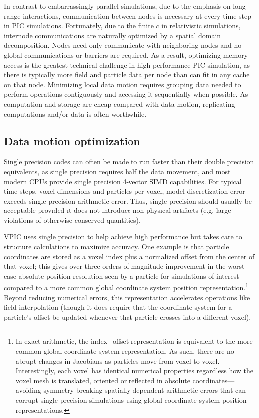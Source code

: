 \documentclass[journal,twoside]{IEEEtran}
\begin{document}
In contrast to embarrassingly parallel simulations, due to the
emphasis on long range interactions, communication between nodes is
necessary at every time step in PIC simulations.  Fortunately, due to the
finite $c$ in relativistic simulations, internode communications are
naturally optimized by a spatial domain decomposition.  Nodes need
only communicate with neighboring nodes and no global communications
or barriers are required.  As a result, optimizing memory access is
the greatest technical challenge in high performance PIC simulation, as
there is typically more field and particle data per node than can fit
in any cache on that node.  Minimizing local data motion requires
grouping data needed to perform operations contiguously and accessing
it sequentially when possible.  As computation and storage are cheap
compared with data motion, replicating computations and/or data is
often worthwhile.

\subsection{Data motion optimization}

Single precision codes can often be made to run faster than their
double precision equivalents, as single precision requires half the
data movement, and most modern CPUs provide single precision 4-vector
SIMD capabilities.  For typical time steps, voxel dimensions and
particles per voxel, model discretization error exceeds single
precision arithmetic error.  Thus, single precision should usually be
acceptable provided it does not introduce non-physical artifacts
(e.g. large violations of otherwise conserved quantities).

VPIC uses single precision to help achieve high performance but takes
care to structure calculations to maximize accuracy.  One example is
that particle coordinates are stored as a voxel index plus a
normalized offset from the center of that voxel; this gives over three
orders of magnitude improvement in the worst case absolute position
resolution seen by a particle for simulations of interest compared to
a more common global coordinate system position
representation.\footnote{In exact arithmetic, the index+offset
representation is equivalent to the more common global coordinate
system representation.  As such, there are no abrupt changes in
Jacobians as particles move from voxel to voxel.  Interestingly, each
voxel has identical numerical properties regardless how the voxel mesh
is translated, oriented or reflected in absolute
coordinates---avoiding symmetry breaking spatially dependent
arithmetic errors that can corrupt single precision simulations using
global coordinate system position representations.}  Beyond reducing
numerical errors, this representation accelerates operations like
field interpolation (though it does require that the coordinate system
for a particle's offset be updated whenever that particle crosses into
a different voxel).
\end{document}
